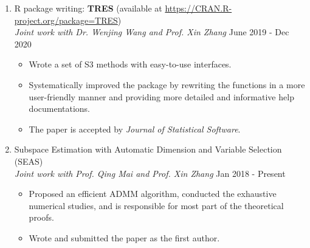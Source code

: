 \documentclass[10pt, oneside]{article}
\begin{document}
\begin{enumerate}[itemsep=0pt]
    \item R package writing: \textbf{TRES} (available at \url{https://CRAN.R-project.org/package=TRES})\\
    \textit{Joint work with Dr. Wenjing Wang and Prof. Xin Zhang} \hfill June 2019 - Dec 2020
    \begin{itemize}[topsep=-2pt,itemsep=-1pt]
        \item Wrote a set of S3 methods with easy-to-use interfaces.
        \item Systematically improved the package by rewriting the functions in a more user-friendly manner and providing more detailed and informative help documentations.
        \item The paper is accepted by \textit{Journal of Statistical Software}.
    \end{itemize}

    \item Subspace Estimation with Automatic Dimension and Variable Selection (SEAS)\\
    \textit{Joint work with Prof. Qing Mai and Prof. Xin Zhang} \hfill  Jan 2018 - Present

    \begin{itemize}[topsep=-2pt,itemsep=-1pt]
        \item Proposed an efficient ADMM algorithm, conducted the exhaustive numerical studies, and is responsible for most part of the theoretical proofs.
        \item Wrote and submitted the paper as the first author.
    \end{itemize}

\end{enumerate}
\end{document}

